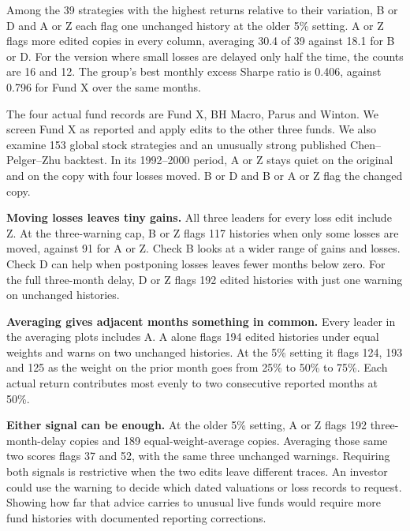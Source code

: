 \documentclass[11pt,letterpaper]{article}
\newcommand{\subhead}[1]{\vspace{3pt}{\large\bfseries #1}\par}
\begin{document}
\newpage
\subhead{What happens to the strongest strategies?}
Among the 39 strategies with the highest returns relative to their variation, B or D and A or Z each flag one unchanged history at the older 5\% setting. A or Z flags more edited copies in every column, averaging 30.4 of 39 against 18.1 for B or D. For the version where small losses are delayed only half the time, the counts are 16 and 12. The group's best monthly excess Sharpe ratio is 0.406, against 0.796 for Fund X over the same months.

The four actual fund records are Fund X, BH Macro, Parus and Winton. We screen Fund X as reported and apply edits to the other three funds. We also examine 153 global stock strategies and an unusually strong published Chen--Pelger--Zhu backtest. In its 1992--2000 period, A or Z stays quiet on the original and on the copy with four losses moved. B or D and B or A or Z flag the changed copy.

\subhead{Why different checks win}
\textbf{Moving losses leaves tiny gains.} All three leaders for every loss edit include Z. At the three-warning cap, B or Z flags 117 histories when only some losses are moved, against 91 for A or Z. Check B looks at a wider range of gains and losses. Check D can help when postponing losses leaves fewer months below zero. For the full three-month delay, D or Z flags 192 edited histories with just one warning on unchanged histories.

\textbf{Averaging gives adjacent months something in common.} Every leader in the averaging plots includes A. A alone flags 194 edited histories under equal weights and warns on two unchanged histories. At the 5\% setting it flags 124, 193 and 125 as the weight on the prior month goes from 25\% to 50\% to 75\%. Each actual return contributes most evenly to two consecutive reported months at 50\%.

\textbf{Either signal can be enough.} At the older 5\% setting, A or Z flags 192 three-month-delay copies and 189 equal-weight-average copies. Averaging those same two scores flags 37 and 52, with the same three unchanged warnings. Requiring both signals is restrictive when the two edits leave different traces. An investor could use the warning to decide which dated valuations or loss records to request. Showing how far that advice carries to unusual live funds would require more fund histories with documented reporting corrections.
\end{document}
